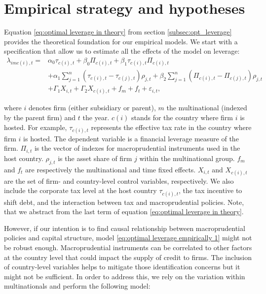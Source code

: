 \documentclass[12pt]{article}
\begin{document}
	\section{Empirical strategy and hypotheses}
	\label{sec:strategy}
	Equation \ref{eq:optimal leverage in theory} from section \ref{subsec:opt_leverage} provides the theoretical foundation for our empirical models. We start with a specification that allow us to estimate all the effects of the model on leverage: 
	\begin{equation}
	\begin{aligned}
	\lambda_{imc(i),t}=&\alpha_0\tau_{c(i),t}+\beta_0\Pi_{c(i),t}+\beta_1\tau_{c(i),t}\Pi_{c(i),t}\\
	&+\alpha_1\sum_{j=1}^{n}(\tau_{c(i),t}-\tau_{c(j),t})\rho_{j,t}+\beta_2\sum_{j=1}^{n}(\Pi_{c(i),t}-\Pi_{c(j),t})\rho_{j,t}\\
	&+\Gamma_1 X_{i,t}+\Gamma_2 X_{c(i),t}+f_{m}+f_{t}+\varepsilon_{i,t},
	\label{eq:optimal leverage empirically 1}
	\end{aligned}
	\end{equation}
	
	where $i$ denotes firm (either subsidiary or parent), $m$ the multinational (indexed by the parent firm) and $t$ the year. $c(i)$ stands for the country where firm $i$ is hosted. For example, $\tau_{c(i),t}$ represents the effective tax rate in the country where firm $i$ is hosted. The dependent variable is a financial leverage measure of the firm. $\Pi_{i,t}$ is the vector of indexes for macroprudential instruments used in the host country. $\rho_{j,t}$ is the asset share of firm $j$ within the multinational group. $f_{m}$ and $f_{t}$ are respectively the multinational and time fixed effects. $X_{i,t}$ and $X_{c(i),t}$ are the set of firm- and country-level control variables, respectively. We also include the corporate tax level at the host country $\tau_{c(i),t}$, the tax incentive to shift debt, and the interaction between tax and macroprudential policies. Note, that we abstract from the last term of equation \ref{eq:optimal leverage in theory}. 
	
	However, if our intention is to find causal relationship between macroprudential policies and capital structure, model \ref{eq:optimal leverage empirically 1} might not be robust enough. Macroprudential instruments can be correlated to other factors at the country level that could impact the supply of credit to firms. The inclusion of country-level variables helps to mitigate those identification concerns but it might not be sufficient. In order to address this, we rely on the variation within multinationals and perform the following model:
	
\end{document}
